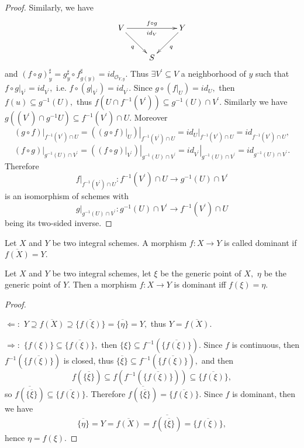 \begin{proof}
Similarly, we have
\[ \xymatrix{
   V \ar[rr]^-{f\circ g}_-{id_V} \ar[dr]_q & & Y \ar[dl]^q \\
   & S }  \]
and $(f\circ g)^{\sharp}_y=g_y^{\sharp}\circ
f^{\sharp}_{g(y)}=id_{\mathcal {O}_{Y,y}}.$ Thus $\exists
V^{\prime}\subseteq V$ a neighborhood of $y$ such that $f\circ
\left.g\right|_{V^{\prime}}=id_{V^{\prime}},$ i.e.
$f\circ(\left.g\right|_{V^{\prime}})=id_{V^{\prime}}.$ Since
$g\circ(\left.f\right|_U)=id_U,$ then $f(u)\subseteq g^{-1}(U),$
thus $f(U\cap f^{-1}(V^{\prime}))\subseteq g^{-1}(U)\cap
V^{\prime}.$ Similarly we have $g((V^{\prime})\cap g^{-1}U)\subseteq
f^{-1}(V^{\prime})\cap U.$ Moreover
$$\left.(g\circ f)\right|_{f^{-1}(V^{\prime})\cap U}=
\left.(\left.(g\circ f)\right|_U)\right|_{f^{-1}(V^{\prime})\cap U}=
\left.id_U\right|_{f^{-1}(V^{\prime})\cap
U}=id_{f^{-1}(V^{\prime})\cap U},$$
$$\left.(f\circ g)\right|_{g^{-1}(U)\cap V^{\prime}}=
\left.(\left.(f\circ g)\right|_{V^{\prime}})\right|_{g^{-1}(U)\cap
V^{\prime}}= \left.id_{V^{\prime}}\right|_{g^{-1}(U)\cap
V^{\prime}}=id_{g^{-1}(U)\cap V^{\prime}}.$$ Therefore
$$\left.f\right|_{f^{-1}(V^{\prime})\cap U}: f^{-1}(V^{\prime})\cap U\rightarrow g^{-1}(U)\cap V^{\prime}$$
is an isomorphism of schemes with
$$\left.g\right|_{g^{-1}(U)\cap V^{\prime}}: g^{-1}(U)\cap V^{\prime}\rightarrow f^{-1}(V^{\prime})\cap U$$
being its two-sided inverse.
\end{proof}
\begin{Def}
Let $X$ and $Y$ be two integral schemes. A morphism $f: X\rightarrow
Y$ is called dominant if $\overline{f(X)}=Y.$
\end{Def}
\begin{prop}
Let $X$ and $Y$ be two integral schemes, let $\xi$ be the generic
point of $X,$ $\eta$ be the generic point of $Y.$ Then a morphism
$f: X\rightarrow Y$ is dominant iff $f(\xi)=\eta.$
\end{prop}
\begin{proof}\

$\Longleftarrow:$
$Y\supseteq\overline{f(X)}\supseteq\overline{\{f(\xi)\}}=\overline{\{\eta\}}=Y,$
thus $Y=\overline{f(X)}.$

$\Longrightarrow:$ $\{f(\xi)\}\subseteq\overline{\{f(\xi)\}},$ then
$\{\xi\}\subseteq f^{-1}(\overline{\{f(\xi)\}}).$ Since $f$ is
continuous, then $f^{-1}(\overline{\{f(\xi)\}})$ is closed, thus
$\overline{\{\xi\}}\subseteq f^{-1}(\overline{\{f(\xi)\}}),$ and
then $$f(\overline{\{\xi\}})\subseteq
f(f^{-1}(\overline{\{f(\xi)\}}))\subseteq \overline{\{f(\xi)\}},$$
so $\overline{f(\overline{\{\xi\}})} \subseteq
\overline{\{f(\xi)\}}.$ Therefore
$\overline{f(\overline{\{\xi\}})}=\overline{\{f(\xi)\}}.$ Since $f$
is dominant, then we have
$$\overline{\{\eta\}}=Y=\overline{f(X)}=\overline{f(\overline{\{\xi\}})}=\overline{\{f(\xi)\}},$$
hence $\eta=f(\xi).$
\end{proof}
